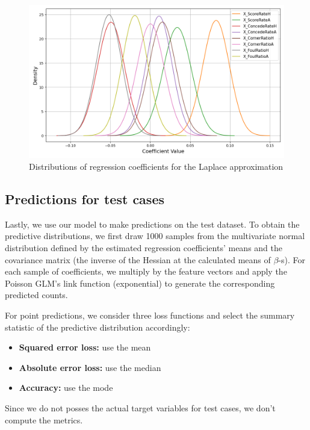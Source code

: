 \documentclass[9pt]{IEEEtran}
\begin{document}
\begin{figure}[h]
\centering
\includegraphics[width=1\columnwidth]{figures/approximation.png}
\caption{Distributions of regression coefficients for the Laplace approximation}
\label{fig:approx}
\end{figure}

\subsection{Predictions for test cases}
Lastly, we use our model to make predictions on the test dataset. To 
obtain the predictive distributions, we first draw 1000 samples from the
 multivariate normal distribution defined by the estimated regression 
 coefficients’ means and the covariance matrix (the inverse of the Hessian
 at the calculated means of $\beta$-s). For each sample of coefficients, 
 we multiply by the feature vectors and apply the Poisson GLM’s link 
 function (exponential) to generate the corresponding predicted counts.

For point predictions, we consider three loss functions and select the summary statistic of the predictive distribution accordingly:
\begin{itemize}
    \item \textbf{Squared error loss:} use the mean
    \item \textbf{Absolute error loss:} use the median
    \item \textbf{Accuracy:} use the mode
\end{itemize}

Since we do not posses the actual target variables for test cases, we 
don't compute the metrics. 


\newpage
\end{document}
